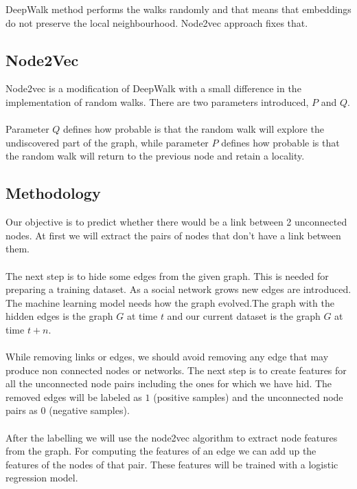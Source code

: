 \noindent  DeepWalk method performs the walks randomly and that means that embeddings do not preserve the local neighbourhood. Node2vec approach fixes that.

\subsection{Node2Vec}

Node2vec is a modification of DeepWalk with a small difference in  the implementation of random walks. There are two parameters introduced, $P$ and $Q$. 
\\
\\
Parameter $Q$ defines how probable is that the random walk will explore the undiscovered part of the graph, while parameter $P$ defines how probable is that the random walk will return to the previous node and retain a locality.

\subsection{Methodology}
\label{sec:methodology}

Our objective is to predict whether there would be a link between 2 unconnected nodes. At first we will extract the pairs of nodes that don't have a link between them.
\\
\\
The next step is to hide some edges from the given graph. This is needed for preparing a training dataset. As a social network grows new edges are introduced. The machine learning model needs how the graph evolved.The graph with the hidden edges is the graph $G$ at time $t$ and our current dataset is the graph $G$ at time $t+n$.
\\
\\
While removing links or edges, we should avoid removing any edge that may produce non connected nodes or networks. The next step is to create features for all the unconnected node pairs including the ones for which we have hid. The removed edges will be labeled as $1$ (positive samples) and the unconnected node pairs as $0$ (negative samples).
\\
\\
After the labelling we will use the node2vec algorithm to extract node features from the graph. For computing the features of an edge we can add up the features of the nodes of that pair. These features will be trained with a logistic regression model.

\clearpage
